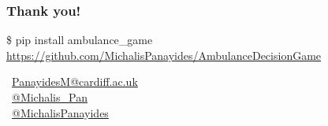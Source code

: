\begin{frame}
    \frametitle{\Large{Thank you!}}
    \centering


    \vspace{1.5cm}
    \small{\$ pip install ambulance\_game}
    \small{\url{https://github.com/MichalisPanayides/AmbulanceDecisionGame}}


    \vspace{1.5cm}
    \faEnvelope \, \url{PanayidesM@cardiff.ac.uk} \\
    \faTwitterSquare \, \url{@Michalis_Pan} \\
    \faGithubSquare \, \url{@MichalisPanayides} \\

\end{frame}



